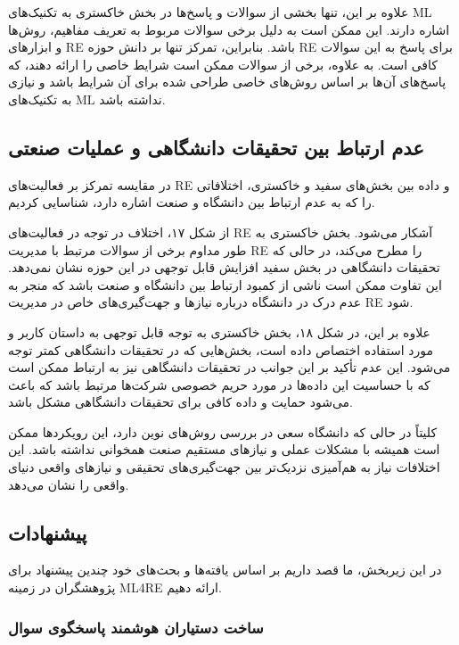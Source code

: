 \documentclass[a4paper,10pt]{article}
\begin{document}
            علاوه بر این، تنها بخشی از سوالات و پاسخ‌ها در بخش خاکستری به تکنیک‌های ML اشاره دارند. این ممکن است به دلیل برخی سوالات مربوط به تعریف مفاهیم، روش‌ها و ابزارهای RE باشد. بنابراین، تمرکز تنها بر دانش حوزه RE برای پاسخ به این سوالات کافی است. به علاوه، برخی از سوالات ممکن است شرایط خاصی را ارائه دهند، که پاسخ‌های آن‌ها بر اساس روش‌های خاصی طراحی شده برای آن شرایط باشد و نیازی به تکنیک‌های ML نداشته باشد.

        \subsection{عدم ارتباط بین تحقیقات دانشگاهی و عملیات صنعتی}

            در مقایسه تمرکز بر فعالیت‌های RE و داده بین بخش‌های سفید و خاکستری، اختلافاتی را که به عدم ارتباط بین دانشگاه و صنعت اشاره دارد، شناسایی کردیم.

            از شکل ۱۷، اختلاف در توجه در فعالیت‌های RE آشکار می‌شود. بخش خاکستری به طور مداوم برخی از سوالات مرتبط با مدیریت RE را مطرح می‌کند، در حالی که تحقیقات دانشگاهی در بخش سفید افزایش قابل توجهی در این حوزه نشان نمی‌دهد. این تفاوت ممکن است ناشی از کمبود ارتباط بین دانشگاه و صنعت باشد که منجر به عدم درک در دانشگاه درباره نیازها و جهت‌گیری‌های خاص در مدیریت RE شود.
            
            علاوه بر این، در شکل ۱۸، بخش خاکستری به توجه قابل توجهی به داستان کاربر و مورد استفاده اختصاص داده است، بخش‌هایی که در تحقیقات دانشگاهی کمتر توجه می‌شود. این عدم تأکید بر این جوانب در تحقیقات دانشگاهی نیز به ارتباط ممکن است که با حساسیت این داده‌ها در مورد حریم خصوصی شرکت‌ها مرتبط باشد که باعث می‌شود حمایت و داده کافی برای تحقیقات دانشگاهی مشکل باشد.

            کلیتاً در حالی که دانشگاه سعی در بررسی روش‌های نوین دارد، این رویکردها ممکن است همیشه با مشکلات عملی و نیازهای مستقیم صنعت همخوانی نداشته باشد. این اختلافات نیاز به هم‌آمیزی نزدیک‌تر بین جهت‌گیری‌های تحقیقی و نیازهای واقعی دنیای واقعی را نشان می‌دهد.

        \subsection{پیشنهادات}

        در این زیربخش، ما قصد داریم بر اساس یافته‌ها و بحث‌های خود چندین پیشنهاد برای پژوهشگران در زمینه ML4RE ارائه دهیم.

        \subsubsection{ساخت دستیاران هوشمند پاسخگوی سوال}
\end{document}
